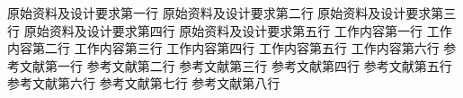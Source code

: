 \assignReq
{原始资料及设计要求第一行}
{原始资料及设计要求第二行}
{原始资料及设计要求第三行}
{原始资料及设计要求第四行}
{原始资料及设计要求第五行}
\assignWork
{工作内容第一行}
{工作内容第二行}
{工作内容第三行}
{工作内容第四行}
{工作内容第五行}
{工作内容第六行}
\assignRef
{参考文献第一行}
{参考文献第二行}
{参考文献第三行}
{参考文献第四行}
{参考文献第五行}
{参考文献第六行}
{参考文献第七行}
{参考文献第八行}